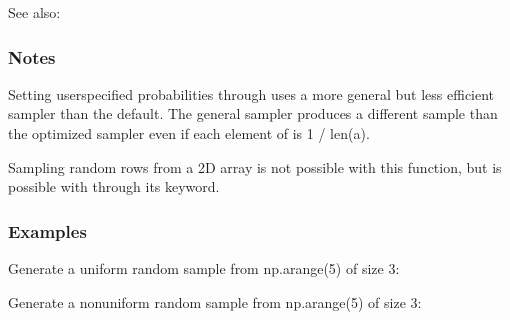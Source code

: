 \documentclass[letterpaper,10pt,english]{sphinxmanual}
\begin{document}
\begin{fulllineitems}
\begin{sphinxseealso}{See also:}
\begin{description}
\end{description}


\end{sphinxseealso}

\subsubsection*{Notes}

\sphinxAtStartPar
Setting user\sphinxhyphen{}specified probabilities through  uses a more general but less
efficient sampler than the default. The general sampler produces a different sample
than the optimized sampler even if each element of  is 1 / len(a).

\sphinxAtStartPar
Sampling random rows from a 2\sphinxhyphen{}D array is not possible with this function,
but is possible with  through its  keyword.
\subsubsection*{Examples}

\sphinxAtStartPar
Generate a uniform random sample from np.arange(5) of size 3:

\begin{sphinxVerbatim}[commandchars=\\\{\}]
 
\end{sphinxVerbatim}

\sphinxAtStartPar
Generate a non\sphinxhyphen{}uniform random sample from np.arange(5) of size 3:

\begin{sphinxVerbatim}[commandchars=\\\{\}]
  \PYG{p}{[}    \PYG{p}{]}
\end{sphinxVerbatim}


\end{fulllineitems}
\end{document}
